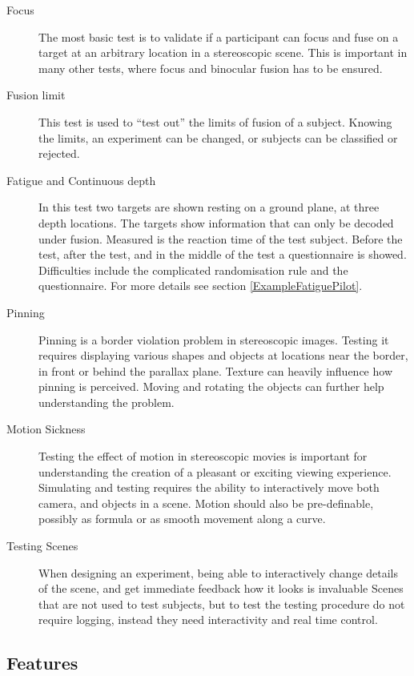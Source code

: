 \begin{description}
\item[Focus]
The most basic test is to validate if a participant can focus and fuse on a target at an arbitrary location in a stereoscopic scene.
This is important in many other tests, where focus and binocular fusion has to be ensured.

\item[Fusion limit]
This test is used to ``test out'' the limits of fusion of a subject.
Knowing the limits, an experiment can be changed, or subjects can be classified or rejected.

\item[Fatigue and Continuous depth]
In this test two targets are shown resting on a ground plane, at three depth locations.
The targets show information that can only be decoded under fusion.
Measured is the reaction time of the test subject.
Before the test, after the test, and in the middle of the test a questionnaire is showed.
Difficulties include the complicated randomisation rule and the questionnaire.
For more details see section \ref{ExampleFatiguePilot}.

\item[Pinning]
Pinning is a border violation problem in stereoscopic images.
Testing it requires displaying various shapes and objects at locations near the border, in front or behind the parallax plane.
Texture can heavily influence how pinning is perceived.
Moving and rotating the objects can further help understanding the problem.

\item[Motion Sickness]
Testing the effect of motion in stereoscopic movies is important for understanding the creation of a pleasant or exciting viewing experience.
Simulating and testing requires the ability to interactively move both camera, and objects in a scene.
Motion should also be pre-definable, possibly as formula or as smooth movement along a curve.

\item[Testing Scenes]
When designing an experiment, being able to interactively change details of the scene, and get immediate feedback how it looks is invaluable
Scenes that are not used to test subjects, but to test the testing procedure do not require logging, instead they need interactivity and real time control.
\end{description}


\subsection{Features}

